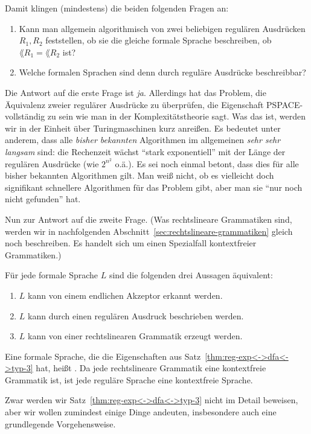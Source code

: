 Damit klingen (mindestens) die beiden folgenden Fragen an:
% 
\begin{enumerate}
\item Kann man allgemein algorithmisch von zwei beliebigen regulären
  Ausdrücken $R_1,R_2$ feststellen, ob sie die gleiche formale Sprache
  beschreiben, \dh ob $\lang{R_1}=\lang{R_2}$ ist?
\item Welche formalen Sprachen sind denn durch reguläre Ausdrücke
  beschreibbar?
\end{enumerate}
% 
Die Antwort auf die erste Frage ist \emph{ja}.  Allerdings hat das
Problem, die Äquivalenz zweier regulärer Ausdrücke zu überprüfen, die
Eigenschaft PSPACE-vollständig zu sein wie man in der
Komplexitätstheorie sagt. Was das ist, werden wir in der Einheit über
Turingmaschinen kurz anreißen. Es bedeutet unter anderem, dass alle
\emph{bisher bekannten} Algorithmen im allgemeinen \emph{sehr sehr
  langsam} sind: die Rechenzeit wächst "`stark exponentiell"' mit der
Länge der regulären Ausdrücke (\zB wie $2^{n^2}$ o.ä.). Es sei noch
einmal betont, dass dies für alle bisher bekannten Algorithmen
gilt. Man weiß nicht, ob es vielleicht doch signifikant schnellere
Algorithmen für das Problem gibt, aber man sie "`nur noch nicht
gefunden"' hat.

Nun zur Antwort auf die zweite Frage. (Was rechtslineare Grammatiken
sind, werden wir in nachfolgenden
Abschnitt~\ref{sec:rechtslineare-grammatiken} gleich noch
beschreiben. Es handelt sich um einen Spezialfall kontextfreier
Grammatiken.)
\begin{satz}
  \label{thm:reg-exp<->dfa<->typ-3}
  Für jede formale Sprache $L$ sind die folgenden drei Aussagen äquivalent:
  \begin{enumerate}
  \item $L$ kann von einem endlichen Akzeptor erkannt werden.
  \item $L$ kann durch einen regulären Ausdruck beschrieben werden.
  \item $L$ kann von einer rechtslinearen Grammatik erzeugt werden.
  \end{enumerate}
\end{satz}
%
Eine formale Sprache, die die Eigenschaften aus
Satz~\ref{thm:reg-exp<->dfa<->typ-3} hat, heißt .  Da jede
rechtslineare Grammatik eine kontextfreie Grammatik ist, ist jede
reguläre Sprache eine kontextfreie Sprache.

Zwar werden wir Satz~\ref{thm:reg-exp<->dfa<->typ-3} nicht im Detail
beweisen, aber wir wollen zumindest einige Dinge andeuten,
insbesondere auch eine grundlegende
Vorgehensweise.


